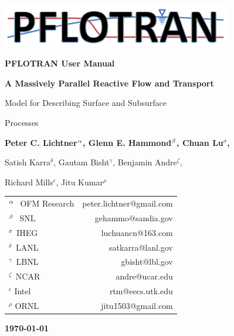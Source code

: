 \begin{center}

\includegraphics[width=0.75\textwidth]{./figs/pflotran_logo.jpg}

\dblline

{\bf\huge PFLOTRAN User Manual}

\vspace{0.5cm}

{\bf\LARGE A Massively Parallel Reactive Flow and Transport 

Model for Describing Surface and Subsurface 

Processes}

\vspace{0.5cm}

{\bf\large Peter C. Lichtner${^{\alpha}}$, Glenn E. Hammond${^{\beta}}$, Chuan Lu${^\sigma}$, 

Satish Karra${^\delta}$, Gautam Bisht$^{\gamma}$, Benjamin Andre$^{\zeta}$, 

Richard Mills$^{\epsilon}$, Jitu Kumar$^{\rho}$}

\vspace{0.5cm}

\begin{tabular}{lr}
$^{{\alpha}_{~}}$ OFM Research & peter.lichtner@gmail.com\\
$^{{\beta}_{~}}$ SNL & gehammo@sandia.gov\\
$^{\sigma_{~}}$ IHEG & luchuancn@163.com\\
$^{\delta_{~}}$ LANL & satkarra@lanl.gov\\
$^{\gamma_{~}}$ LBNL & gbisht@lbl.gov\\
$^{\zeta_{~}}$ NCAR & andre@ucar.edu\\
$^{\epsilon}$ Intel & rtm@eecs.utk.edu \\
$^{\rho}$ ORNL & jitu1503@gmail.com
\end{tabular}

\vspace{0.5cm}

{\bf\large\today}

\vspace{0.5cm}

\end{center}

